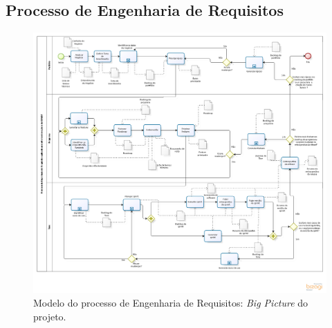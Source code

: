 \begin{anexosenv}

\partanexos

\chapter{Processo de Engenharia de Requisitos}

  \begin{figure}[!htbp]
    \centering
    \includegraphics[scale=0.47, angle = 90]{editaveis/figuras/project_big_picture}
    \caption[Modelo do processo de Engenharia de Requisitos]
	{Modelo do processo de Engenharia de Requisitos: \textit{Big Picture} do projeto.}
    \label{project_big_picture}
  \end{figure}

\end{anexosenv}

